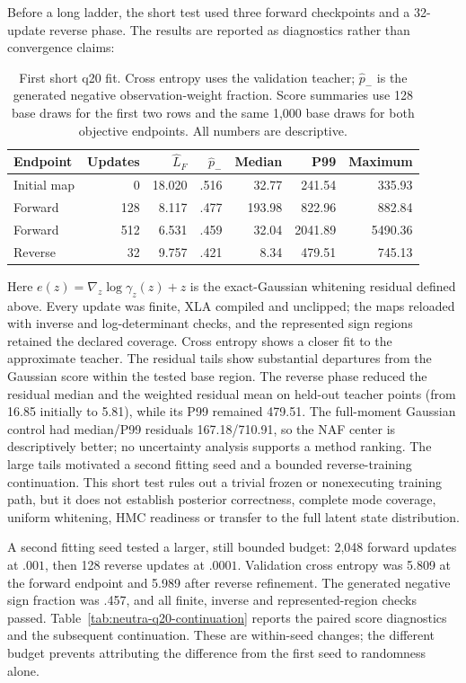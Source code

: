 Before a long ladder, the short test used three forward checkpoints and a
32-update reverse phase. The results are reported as diagnostics rather than
convergence claims:

\begin{table}[htbp]
\centering
\caption{First short q20 fit. Cross entropy uses the validation teacher;
$\hat p_-$ is the generated negative observation-weight fraction. Score
summaries use 128 base draws for the first two rows and the same 1,000 base
draws for both objective endpoints. All numbers are descriptive.}
\label{tab:neutra-q20-short}
\begin{tabular}{lrrrrrr}
\toprule
Endpoint & Updates & $\widehat L_F$ & $\hat p_-$ & Median & P99 & Maximum\\
\midrule
Initial map & 0 & 18.020 & .516 & 32.77 & 241.54 & 335.93\\
Forward & 128 & 8.117 & .477 & 193.98 & 822.96 & 882.84\\
Forward & 512 & 6.531 & .459 & 32.04 & 2041.89 & 5490.36\\
Reverse & 32 & 9.757 & .421 & 8.34 & 479.51 & 745.13\\
\bottomrule
\end{tabular}
\end{table}

Here $e(z)=\nabla_z\log\gamma_z(z)+z$ is the exact-Gaussian whitening
residual defined above. Every update was finite, XLA compiled and unclipped;
the maps reloaded with inverse and log-determinant checks, and the represented
sign regions retained the declared coverage. Cross entropy shows a closer fit
to the approximate teacher. The residual tails show substantial departures
from the Gaussian score within the tested base region.
The reverse phase reduced the residual median and the weighted residual mean
on held-out teacher points (from 16.85 initially to 5.81), while its P99
remained 479.51. The full-moment Gaussian control had median/P99 residuals
167.18/710.91, so the NAF center is descriptively better; no uncertainty
analysis supports a method ranking. The large tails motivated a second fitting
seed and a bounded reverse-training continuation. This short test rules out a trivial frozen or nonexecuting
training path, but it does not establish posterior correctness, complete mode
coverage, uniform whitening, HMC readiness or transfer to the full latent
state distribution.

A second fitting seed tested a larger, still bounded budget: 2,048 forward
updates at $.001$, then 128 reverse updates at $.0001$. Validation cross entropy
was 5.809 at the forward endpoint and 5.989 after reverse refinement. The
generated negative sign fraction was .457, and all finite, inverse and
represented-region checks passed. Table~\ref{tab:neutra-q20-continuation}
reports the paired score diagnostics and the subsequent continuation.
These are within-seed changes; the different budget prevents attributing the
difference from the first seed to randomness alone.

